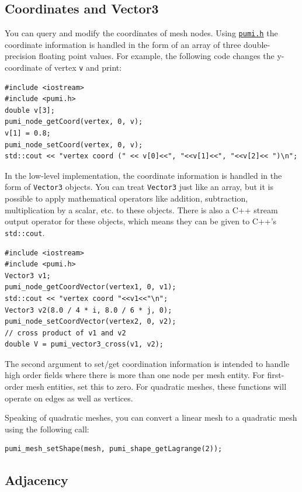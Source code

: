 \documentclass{article}
\begin{document}
\subsection{Coordinates and Vector3}

You can query and modify the coordinates of mesh nodes.
Using \href{https://github.com/SCOREC/core/blob/master/pumi/pumi.h}
{\texttt{pumi.h}} the coordinate information is handled in the form of
an array of three double-precision floating point values.
For example, the following code changes the y-coordinate of vertex {\texttt{v}} and print:

\begin{lstlisting}
#include <iostream>
#include <pumi.h>
double v[3];
pumi_node_getCoord(vertex, 0, v);
v[1] = 0.8;
pumi_node_setCoord(vertex, 0, v);
std::cout << "vertex coord (" << v[0]<<", "<<v[1]<<", "<<v[2]<< ")\n";
\end{lstlisting}

In the low-level implementation, the coordinate information is handled in the form of \texttt{Vector3} 
objects.
You can treat \texttt{Vector3} just like an array, but it is
possible to apply mathematical operators like addition, subtraction,
multiplication by a scalar, etc. to these objects.
There is also a C++ stream output operator for these objects, which
means they can be given to C++'s \texttt{std::cout}.

\begin{lstlisting}
#include <iostream>
#include <pumi.h>
Vector3 v1;
pumi_node_getCoordVector(vertex1, 0, v1);
std::cout << "vertex coord "<<v1<<"\n";
Vector3 v2(8.0 / 4 * i, 8.0 / 6 * j, 0);
pumi_node_setCoordVector(vertex2, 0, v2);
// cross product of v1 and v2
double V = pumi_vector3_cross(v1, v2);
\end{lstlisting}

The second argument to set/get coordination information is intended to handle
high order fields where there is more than one node
per mesh entity.
For first-order mesh entities, set this to zero.
For quadratic meshes, these functions will operate on edges as well as vertices.

Speaking of quadratic meshes, you can convert a linear mesh
to a quadratic mesh using the following call:

\begin{lstlisting}
pumi_mesh_setShape(mesh, pumi_shape_getLagrange(2));
\end{lstlisting}

\subsection{Adjacency}
\end{document}
